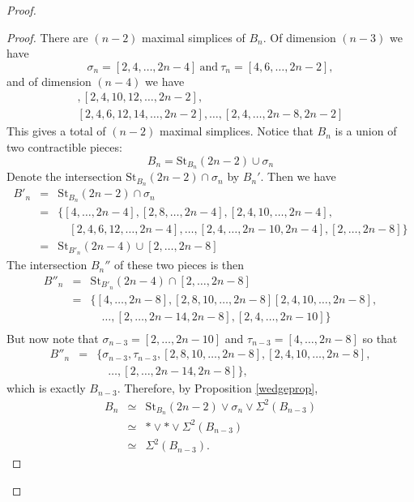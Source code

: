 \documentclass{amsart}
\theoremstyle{definition}
\begin{document}
\begin{proof}
\begin{proof}
    There are $(n-2)$ maximal simplices of $B_n$. Of dimension $(n-3)$ we have $$\sigma_n=[2,4,\dots,2n-4]~\text{and}~\tau_n=[4,6,\dots,2n-2],$$ and of dimension $(n-4)$ we have
    \begin{gather*}
        [2,8,10,\dots,2n-2], [2,4,10,12,\dots,2n-2],\\ [2,4,6,12,14,\dots,2n-2],\dots, [2,4,\dots,2n-8,2n-2]
    \end{gather*}
    This gives a total of $(n-2)$ maximal simplices. Notice that $B_n$ is a union of two contractible pieces:
        $$B_n=\text{St}_{B_n}(2n-2)\cup\sigma_n$$
Denote the intersection $\text{St}_{B_n}(2n-2)\cap \sigma_n$ by $B_n'$. Then we have
    \begin{eqnarray*}
    B'_n &= & \text{St}_{B_n}(2n-2)\cap\sigma_n \\ 
    & = & \{[4,\dots,2n-4],[2,8,\dots,2n-4],[2,4,10,\dots,2n-4],\\
    &  & \quad [2,4,6,12,\dots,2n-4],\dots,[2,4,\dots,2n-10,2n-4],[2,\dots,2n-8]\}\\
    &= &\text{St}_{B'_n}(2n-4)\cup[2,\dots,2n-8]
    \end{eqnarray*}
The intersection $B_n''$ of these two pieces is then
    \begin{eqnarray*}
    B''_n &= & \text{St}_{B'_n}(2n-4)\cap[2,\dots,2n-8] \\
     & = & \{[4,\dots,2n-8],[2,8,10,\dots,2n-8] [2,4,10,\dots,2n-8],\\
    & & \quad\dots, [2,\dots,2n-14,2n-8],[2,4,\dots,2n-10]\}\\
    \end{eqnarray*}
But now note that $\sigma_{n-3}=[2,\dots,2n-10]$ and $\tau_{n-3} = [4,\dots,2n-8]$ so that
\begin{eqnarray*}
B''_n & = & \{\sigma_{n-3},\tau_{n-3},[2,8,10,\dots,2n-8],[2,4,10,\dots,2n-8], \\
  & & \quad\dots,[2,\dots,2n-14,2n-8]\},
\end{eqnarray*}
which is exactly $B_{n-3}$. Therefore, by Proposition \ref{wedgeprop},
    \begin{eqnarray*}
    B_n& \simeq &\text{St}_{B_n}(2n-2)\vee\sigma_n\vee\Sigma^2(B_{n-3})\\
    &\simeq & \ast\vee\ast\vee\Sigma^2(B_{n-3})\\
    &\simeq & \Sigma^2(B_{n-3}).
    \end{eqnarray*}
\end{proof}


\end{proof}
\end{document}
